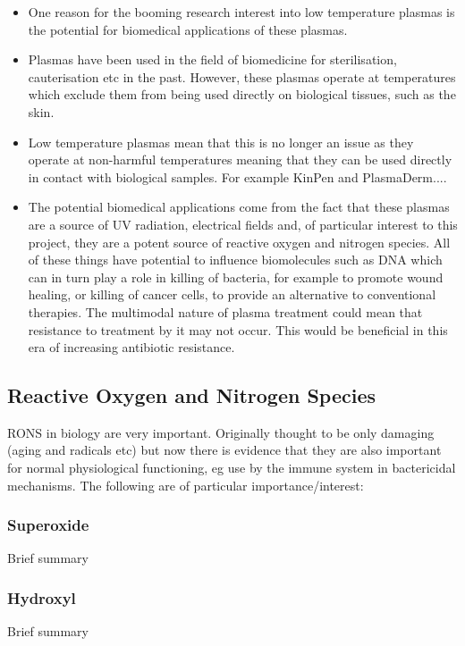 \documentclass[11pt, oneside]{article}   	%
\begin{document}
\begin{itemize}

\item One reason for the booming research interest into low temperature plasmas is the potential for biomedical applications of these plasmas.
\item Plasmas have been used in the field of biomedicine for sterilisation, cauterisation etc in the past. However, these plasmas operate at temperatures which exclude them from being used directly on biological tissues, such as the skin.
\item Low temperature plasmas mean that this is no longer an issue as they operate at non-harmful temperatures meaning that they can be used directly in contact with biological samples. 
For example KinPen and PlasmaDerm....

\item The potential biomedical applications come from the fact that these plasmas are a source of UV radiation, electrical fields and, of particular interest to this project, they are a potent source of reactive oxygen and nitrogen species. All of these things have potential to influence biomolecules such as DNA which can in turn play a role in killing of bacteria, for example to promote wound healing, or killing of cancer cells, to provide an alternative to conventional therapies. 
The multimodal nature of plasma treatment could mean that resistance to treatment by it may not occur. 
This would be beneficial in this era of increasing antibiotic resistance.

\end{itemize}


\subsection{Reactive Oxygen and Nitrogen Species}
RONS in biology are very important. Originally thought to be only damaging (aging and radicals etc) but now there is evidence that they are also important for normal physiological functioning, eg use by the immune system in bactericidal mechanisms.
The following are of particular importance/interest:

\subsubsection{Superoxide}
Brief summary
\subsubsection{Hydroxyl}
Brief summary
\end{document}
